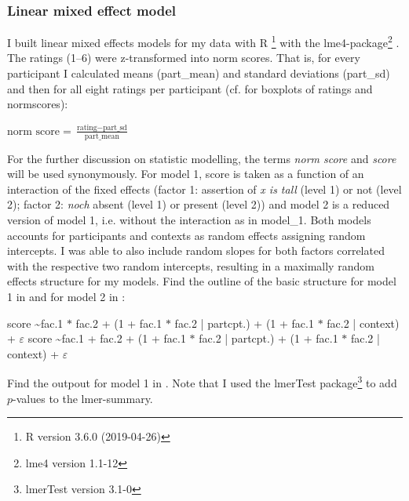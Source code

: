 \documentclass[output=paper]{langsci/langscibook}
\begin{document}
\subsubsection{Linear mixed effect model}\label{sect_non-parametrics}

I built linear mixed effects models for my data with R \citep{Rsoftware}\footnote{R version 3.6.0 (2019-04-26)} with the lme4-package\footnote{lme4 version 1.1-12} \citep{lme4}. The ratings (1--6) were z-transformed into norm scores. That is, for every participant I calculated means (part\_mean) and standard deviations (part\_sd) and then for all eight ratings per participant (cf.  for boxplots of ratings and normscores):

\ea $\text{norm score} = \frac{\text{rating} - \text{part\_sd}}{\text{part\_mean}}$\z

For the further discussion on statistic modelling, the terms \textit{norm score} and \textit{score} will be used synonymously. For model 1, score is taken as a function of an interaction of the fixed effects (factor 1: assertion of \textit{x is tall} (level 1) or not (level 2); factor 2: \textit{noch} absent (level 1) or present (level 2)) and model 2 is a reduced version of model 1, i.e. without the interaction as in model\_1. Both models accounts for participants and contexts as random effects assigning random intercepts. I was able to also include random slopes for both factors correlated with the respective two random intercepts, resulting in a maximally random effects structure for my models. Find the outline of the basic structure for model 1 in  and for model 2 in :

\ea score \textasciitilde fac.1 $*$ fac.2 + (1 + fac.1 $*$ fac.2 | partcpt.) + (1 + fac.1 $*$ fac.2 | context) + $\varepsilon$ \label{LME_model_1}     
\ex score \textasciitilde fac.1 + fac.2 + (1 + fac.1 $*$ fac.2 | partcpt.) + (1 + fac.1 $*$ fac.2 | context) + $\varepsilon$ \label{LME_model_2}        \z

Find the outpout for model 1 in . Note that I used the lmerTest package\footnote{lmerTest version 3.1-0} \citep{lmerTest} to add $p$-values to the lmer-summary.
\end{document}
